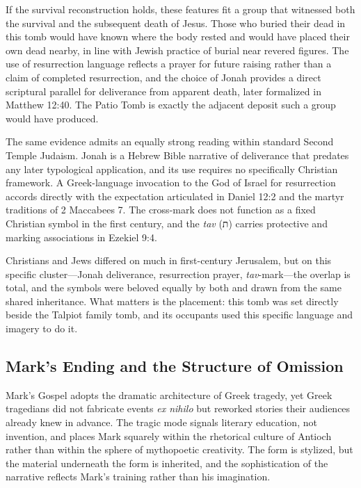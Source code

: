 If the survival reconstruction holds, these features fit a group that witnessed both the survival and the subsequent death of Jesus.
Those who buried their dead in this tomb would have known where the body rested and would have placed their own dead nearby, in line with Jewish practice of burial near revered figures.
The use of resurrection language reflects a prayer for future raising rather than a claim of completed resurrection, and the choice of Jonah provides a direct scriptural parallel for deliverance from apparent death, later formalized in Matthew 12:40.
The Patio Tomb is exactly the adjacent deposit such a group would have produced.

The same evidence admits an equally strong reading within standard Second Temple Judaism.
Jonah is a Hebrew Bible narrative of deliverance that predates any later typological application, and its use requires no specifically Christian framework.
A Greek-language invocation to the God of Israel for resurrection accords directly with the expectation articulated in Daniel 12:2 and the martyr traditions of 2 Maccabees 7.
The cross-mark does not function as a fixed Christian symbol in the first century, and the \emph{tav} (ת) carries protective and marking associations in Ezekiel 9:4.

Christians and Jews differed on much in first-century Jerusalem, but on this specific cluster---Jonah deliverance, resurrection prayer, \emph{tav}-mark---the overlap is total, and the symbols were beloved equally by both and drawn from the same shared inheritance.
What matters is the placement: this tomb was set directly beside the Talpiot family tomb, and its occupants used this specific language and imagery to do it.

\subsection{Mark's Ending and the Structure of Omission}\label{subsec:mark-ending}

Mark's Gospel adopts the dramatic architecture of Greek tragedy, yet Greek tragedians did not fabricate events \emph{ex nihilo} but reworked stories their audiences already knew in advance.
The tragic mode signals literary education, not invention, and places Mark squarely within the rhetorical culture of Antioch rather than within the sphere of mythopoetic creativity.
The form is stylized, but the material underneath the form is inherited, and the sophistication of the narrative reflects Mark's training rather than his imagination.

